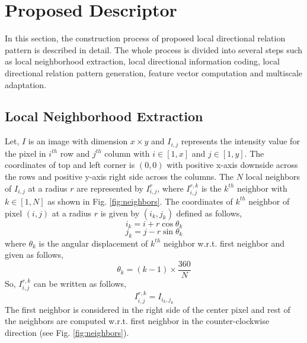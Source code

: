 \documentclass[a4paper]{article}
\begin{document}
\section{Proposed Descriptor}
In this section, the construction process of proposed local directional relation pattern is described in detail. The whole process is divided into several steps such as local neighborhood extraction, local directional information coding, local directional relation pattern generation, feature vector computation and multiscale adaptation.

\subsection{Local Neighborhood Extraction}
Let, $I$ is an image with dimension $x \times y$ and $I_{i,j}$ represents the intensity value for the pixel in $i^{th}$ row and $j^{th}$ column with $i \in [1,x]$ and $j \in [1,y]$. The coordinates of top and left corner is $(0,0)$ with positive x-axis downside across the rows and positive y-axis right side across the columns. The $N$ local neighbors of $I_{i,j}$ at a radius $r$ are represented by $I_{i,j}^{r}$, where $I_{i,j}^{r,k}$ is the $k^{th}$ neighbor with $k \in [1,N]$ as shown in Fig. \ref{fig:neighbors}. The coordinates of $k^{th}$ neighbor of pixel $(i,j)$ at a radius $r$ is given by $(i_k,j_k)$ defined as follows,
\begin{equation}
i_k = i + r\cos\theta_k
\end{equation}
\begin{equation}
j_k = j - r\sin\theta_k
\end{equation}
where $\theta_k$ is the angular displacement of $k^{th}$ neighbor w.r.t. first neighbor and given as follows,
\begin{equation}
\theta_k = (k-1) \times \frac{360}{N} 
\end{equation}
So, $I_{i,j}^{r,k}$ can be written as follows,
\begin{equation}
I_{i,j}^{r,k} = I_{i_k, j_k}
\end{equation}
The first neighbor is considered in the right side of the center pixel and rest of the neighbors are computed w.r.t. first neighbor in the counter-clockwise direction (see Fig. \ref{fig:neighbors}).
\end{document}
